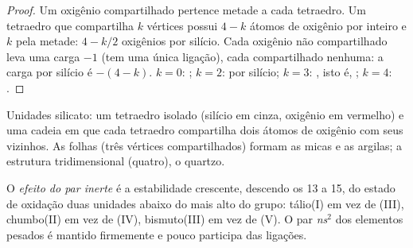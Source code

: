 \begin{proof}
Um oxigênio compartilhado pertence metade a cada tetraedro. Um tetraedro
que compartilha $k$ vértices possui $4 - k$ átomos de oxigênio por
inteiro e $k$ pela metade: $4 -
k/2$ oxigênios por silício. Cada oxigênio não compartilhado leva uma
carga $-1$ (tem uma única ligação), cada compartilhado nenhuma: a carga
por silício é $-(4 - k)$. $k = 0$: ; $k = 2$:  por
silício; $k = 3$: , isto é, ; $k = 4$: .
\end{proof}

\begin{omfigure}

{\small Unidades silicato: um tetraedro  isolado (silício em
cinza, oxigênio em vermelho) e uma cadeia em que cada tetraedro
compartilha dois átomos de oxigênio com seus vizinhos. As folhas (três
vértices compartilhados) formam as micas e as argilas; a estrutura
tridimensional (quatro), o quartzo.}
\end{omfigure}

\begin{definition}\label{def:b1:p-block-13-15:inert-pair}
O \emph{efeito do par inerte} é a estabilidade
crescente, descendo os  13 a 15, do estado de oxidação duas unidades
abaixo do mais alto do grupo: tálio(I) em vez de (III), chumbo(II) em vez
de (IV), bismuto(III) em vez de (V). O par \textit{ns}$^2$ dos elementos
pesados é mantido firmemente e pouco participa das ligações.
\end{definition}

